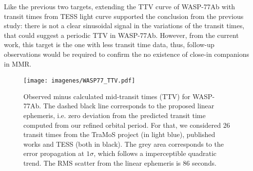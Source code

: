 Like the previous two targets, extending the TTV curve of WASP-77Ab with transit times from TESS light curve supported the conclusion from the previous study: there is not a clear sinusoidal signal in the variations of the transit times, that could suggest a periodic TTV in WASP-77Ab. However, from the current work, this target is the one with less transit time data, thus, follow-up observations would be required to confirm the no existence of close-in companions in MMR.


\begin{figure}[ht]
\texttt{[image: imagenes/WASP77\_TTV.pdf]}
\caption{Observed minus calculated mid-transit times (TTV) for WASP-77Ab. The dashed black line corresponds to the proposed linear ephemeris, i.e. zero deviation from the predicted transit time  computed from our refined orbital period. For that, we considered 26 transit times from the TraMoS project (in light blue), published works and TESS (both in black). The grey area corresponds to the error propagation at $1\sigma$, which follows a imperceptible quadratic trend. The RMS scatter from the linear ephemeris is 86 seconds.}
\label{wasp77_ttv}
\end{figure}



